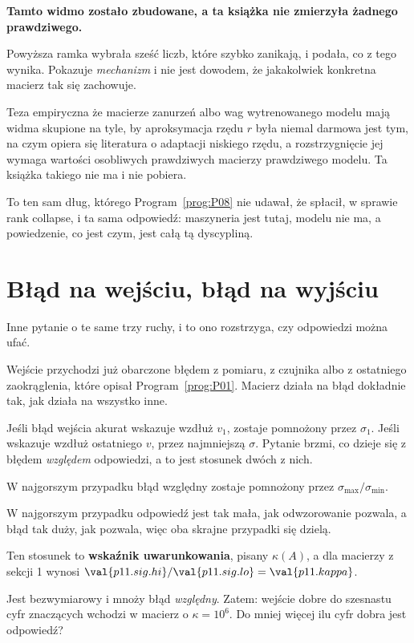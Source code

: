\begin{warning}
\textbf{Tamto widmo zostało zbudowane, a ta książka nie zmierzyła żadnego
prawdziwego.}

Powyższa ramka wybrała sześć liczb, które szybko zanikają, i podała, co z tego
wynika. Pokazuje \emph{mechanizm} i nie jest dowodem, że jakakolwiek konkretna
macierz tak się zachowuje.

Teza empiryczna \dash{} że macierze zanurzeń albo wag wytrenowanego modelu mają
widma skupione na tyle, by aproksymacja rzędu $r$ była niemal darmowa \dash{}
jest tym, na czym opiera się literatura o adaptacji niskiego rzędu, a
rozstrzygnięcie jej wymaga wartości osobliwych prawdziwych macierzy prawdziwego
modelu. Ta książka takiego nie ma i nie pobiera.

To ten sam dług, którego Program~\ref{prog:P08} nie udawał, że spłacił, w
sprawie rank collapse, i ta sama odpowiedź: maszyneria jest tutaj, modelu nie
ma, a powiedzenie, co jest czym, jest całą tą dyscypliną.
\end{warning}

\section{Błąd na wejściu, błąd na wyjściu}
\label{sec:P11-conditioning}

\begin{fr}
Inne pytanie o te same trzy ruchy, i to ono rozstrzyga, czy odpowiedzi można
ufać.

Wejście przychodzi już obarczone błędem \dash{} z pomiaru, z czujnika albo z
ostatniego zaokrąglenia, które opisał Program~\ref{prog:P01}. Macierz
działa na błąd dokładnie tak, jak działa na wszystko inne.

Jeśli błąd wejścia akurat wskazuje wzdłuż $v_1$, zostaje pomnożony przez
$\sigma_1$. Jeśli wskazuje wzdłuż ostatniego $v$, przez najmniejszą $\sigma$.
Pytanie brzmi, co dzieje się z błędem \emph{względem} odpowiedzi, a to jest
stosunek dwóch z nich.
\dotline
\nextframe
\end{fr}

\begin{fr}
\begin{ansblock}
W najgorszym przypadku błąd względny zostaje pomnożony przez
$\sigma_{\max}/\sigma_{\min}$.
\end{ansblock}

W najgorszym przypadku odpowiedź jest tak mała, jak odwzorowanie pozwala, a
błąd tak duży, jak pozwala, więc oba skrajne przypadki się dzielą.

Ten stosunek to \textbf{wskaźnik uwarunkowania}, pisany $\kappa(A)$, a dla
macierzy z sekcji 1 wynosi
$\val{p11.sig.hi}/\val{p11.sig.lo} = \val{p11.kappa}$.

Jest bezwymiarowy i mnoży błąd \emph{względny}. Zatem: wejście dobre do
szesnastu cyfr znaczących wchodzi w macierz o $\kappa = 10^{6}$. Do mniej
więcej ilu cyfr dobra jest odpowiedź?
\dotline
\nextframe
\end{fr}

